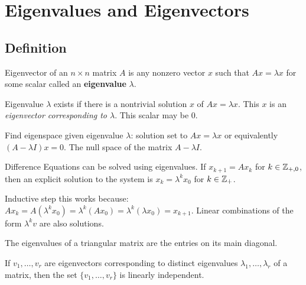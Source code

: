 \section{Eigenvalues and Eigenvectors}
\begin{outline}
\end{outline}

\begin{card}
    \subsection{Definition}

    \begin{compactdesc}
    \item[Eigenvector] of an $n \times n$ matrix $A$ is any nonzero vector $x$
        such that $Ax = \lambda x$ for some scalar called an \textbf{eigenvalue}
        $\lambda$.
    \item[Eigenvalue] $\lambda$ exists if there is a nontrivial solution $x$
        of $Ax = \lambda x$.
        This $x$ is an \textsl{eigenvector corresponding to $\lambda$}.
        This scalar may be $0$.
    \item[Find eigenspace] given eigenvalue $\lambda$: solution set to
        $Ax = \lambda x$ or equivalently $(A - \lambda I) x = 0$.
        The null space of the matrix $A - \lambda I$.
    \item[Difference Equations] can be solved using eigenvalues.
        If $x_{k+1} = Ax_k$ for $k \in \mathbb{Z}_{+,0}$, then an explicit solution to
        the system is $x_k = \lambda^k x_0$ for $k \in \mathbb{Z}_+$.
    \item[Inductive step] this works because:
        $Ax_k = A(\lambda^k x_0) = \lambda^k (A x_0) = \lambda^k(\lambda x_0) = x_{k+1}$.
        Linear combinations of the form $\lambda^k v$ are also solutions.
    \end{compactdesc}

    \begin{theorem}
    The eigenvalues of a triangular matrix are the entries on its main diagonal.
    \end{theorem}

    \begin{theorem}
    If $v_1, \dotsc, v_r$ are eigenvectors corresponding to distinct eigenvalues
    $\lambda_1, \dotsc, \lambda_r$ of a matrix,
    then the set $\{v_1, \dotsc, v_r\}$ is linearly independent.
    \end{theorem}

\end{card}



